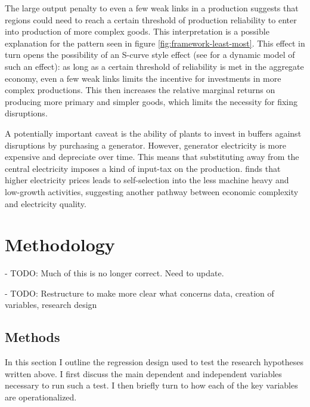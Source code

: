\documentclass[11pt]{article}
\begin{document}
The large output penalty to even a few weak links in a production suggests that regions could need to reach a certain threshold of production reliability to enter into production of more complex goods. This interpretation is a possible explanation for the pattern seen in figure \ref{fig:framework-least-most}. This effect in turn opens the possibility of an S-curve style effect (see \cite{brummitt_contagious_2017} for a dynamic model of such an effect): as long as a certain threshold of reliability is met in the aggregate economy, even a few weak links limits the incentive for investments in more complex productions. This then increases the relative marginal returns on producing more primary and simpler goods, which limits the necessity for fixing disruptions.

A potentially important caveat is the ability of plants to invest in buffers against disruptions by purchasing a generator. However, generator electricity is more expensive and depreciate over time. This means that substituting away from the central electricity imposes a kind of input-tax on the production. \cite{abeberese_electricity_2017} finds that higher electricity prices leads to self-selection into the less machine heavy and low-growth activities, suggesting another pathway between economic complexity and electricity quality.


\newpage

\section{Methodology}%
\label{sub:methodology}

- TODO: Much of this is no longer correct. Need to update.

- TODO: Restructure to make more clear what concerns data, creation of variables, research design

\subsection{Methods}\label{sec:methods}

In this section I outline the regression design used to test the research hypotheses written above. I first discuss the main dependent and independent variables necessary to run such a test. I then briefly turn to how each of the key variables are operationalized.
\end{document}
